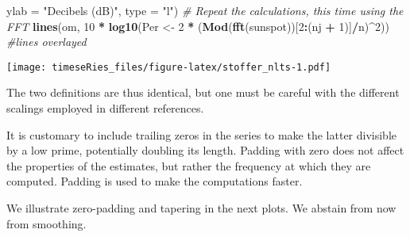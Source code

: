 \documentclass[]{book}
\newenvironment{Shaded}{\begin{snugshade}}{\end{snugshade}}
\newcommand{\KeywordTok}[1]{\textcolor[rgb]{0.13,0.29,0.53}{\textbf{#1}}}
\newcommand{\DataTypeTok}[1]{\textcolor[rgb]{0.13,0.29,0.53}{#1}}
\newcommand{\DecValTok}[1]{\textcolor[rgb]{0.00,0.00,0.81}{#1}}
\newcommand{\StringTok}[1]{\textcolor[rgb]{0.31,0.60,0.02}{#1}}
\newcommand{\CommentTok}[1]{\textcolor[rgb]{0.56,0.35,0.01}{\textit{#1}}}
\newcommand{\OperatorTok}[1]{\textcolor[rgb]{0.81,0.36,0.00}{\textbf{#1}}}
\newcommand{\NormalTok}[1]{#1}
\begin{document}
\begin{Shaded}
\begin{Highlighting}[]
    \DataTypeTok{ylab =} \StringTok{"Decibels (dB)"}\NormalTok{, }\DataTypeTok{type =} \StringTok{"l"}\NormalTok{)}
\CommentTok{# Repeat the calculations, this time using the FFT}
\KeywordTok{lines}\NormalTok{(om, }\DecValTok{10} \OperatorTok{*}\StringTok{ }\KeywordTok{log10}\NormalTok{(Per <-}\StringTok{ }\DecValTok{2} \OperatorTok{*}\StringTok{ }\NormalTok{(}\KeywordTok{Mod}\NormalTok{(}\KeywordTok{fft}\NormalTok{(sunspot))[}\DecValTok{2}\OperatorTok{:}\NormalTok{(nj }\OperatorTok{+}\StringTok{ }\DecValTok{1}\NormalTok{)]}\OperatorTok{/}\NormalTok{n)}\OperatorTok{^}\DecValTok{2}\NormalTok{))  }\CommentTok{#lines overlayed}
\end{Highlighting}
\end{Shaded}

\texttt{[image: timeseRies\_files/figure-latex/stoffer\_nlts-1.pdf]}

The two definitions are thus identical, but one must be careful with the
different scalings employed in different references.

It is customary to include trailing zeros in the series to make the
latter divisible by a low prime, potentially doubling its length.
Padding with zero does not affect the properties of the estimates, but
rather the frequency at which they are computed. Padding is used to make
the computations faster.

We illustrate zero-padding and tapering in the next plots. We abstain
from now from smoothing.
\end{document}
